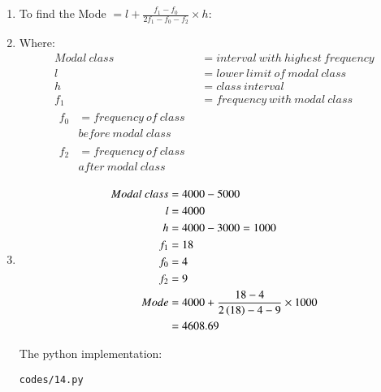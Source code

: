 \renewcommand{\theequation}{\theenumi}
\begin{enumerate}

\item To find the Mode $= l + \frac{f_1 - f_0}{2f_1 - f_0 - f_2} \times h$:

\item Where:
\begin{align*}
Modal\ class &= interval\ with\ highest\ frequency\\
l &= lower\ limit\ of\ modal\ class\\
h &= class\ interval\\
f_1 &= frequency\ with\ modal\ class\\
\begin{split}
f_0 &= frequency\ of\ class\ \\ &before\ modal\ class
\end{split}\\
\begin{split}
f_2 &= frequency\ of\ class\ \\ &after\ modal\ class
\end{split}
\end{align*}

\item 
\begin{align}
Modal\ class &= 4000 - 5000\\ 
l &= 4000\\
h &= 4000 - 3000 = 1000\\
f_1 &= 18\\
f_0 &= 4\\
f_2 &= 9\\
Mode &= 4000 + \frac{18-4}{2\left(18\right) - 4- 9} \times 1000\\
&= 4608.69
\end{align}

The python implementation:
\begin{lstlisting}
codes/14.py
\end{lstlisting}

\end{enumerate}
